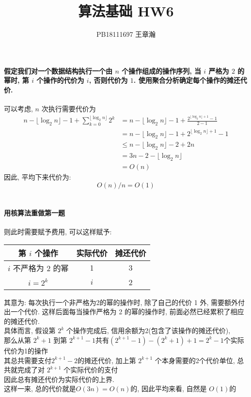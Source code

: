 \documentclass[UTF8]{article}
\title{算法基础 HW6}
\author{PB18111697 王章瀚}
\newcommand{\jumpLine} {\hspace*{\fill} \\}
\newcommand{\floor}[1]{\lfloor#1\rfloor}
\begin{document}
\maketitle
\section{}
\noindent \textbf{假定我们对一个数据结构执行一个由 $n$ 个操作组成的操作序列, 当 $i$ 严格为 $2$ 的幂时, 第 $i$ 个操作的代价为 $i$, 否则代价为 $1$. 使用聚合分析确定每个操作的摊还代价.}\\
\jumpLine
可以考虑, $n$ 次执行需要代价为
\begin{align*}
n - \floor{\log_2 n} - 1 + \sum\limits_{k=0}^{\floor{\log_2 n}}2^k &=n - \floor{\log_2 n} - 1 + \frac{2^{\floor{\log_2 n}+1}-1}{2-1}\\
&=n - \floor{\log_2 n} - 1 + 2^{\floor{\log_2 n}+1}-1\\
&\le n - \floor{\log_2 n} - 2 + 2n\\
&=3n-2-\floor{\log_2 n}\\
&=O(n)
 \end{align*}
因此, 平均下来代价为:
$$O(n)/n=O(1)$$
\section{}
\noindent \textbf{用核算法重做第一题}\\
\jumpLine
则此时需要赋予费用, 可以这样赋予:\\
\begin{center}
\begin{tabular}{|c|c|c|}
\hline
第 $i$ 个操作 & 实际代价 & 摊还代价 \\
\hline
$i$ 不严格为 2 的幂 & 1 & 3 \\
\hline
$i=2^k$ & $i$ & 2\\
\hline
\end{tabular}
\end{center}
其意为: 每次执行一个非严格为2的幂的操作时, 除了自己的代价 1 外, 需要额外付出一个代价. 这样后面每当操作严格为 2 的幂的操作时, 前面必然已经累积了相应的摊还代价.\\
具体而言, 假设第 $2^k$ 个操作完成后, 信用余额为2(包含了该操作的摊还代价), \\
那么从第 $2^k+1$ 到第 $2^{k+1}-1$共有$(2^{k+1}-1) - (2^{k}+1) + 1=2^k-1$个实际代价为1的操作\\
其总共需要支付$2^{k+1}-2$的摊还代价, 加上第 $2^{k+1}$ 个本身需要的2个代价单位, 总共就完成了对 $2^{k+1}$ 个实际代价的支付\\
因此总有摊还代价为实际代价的上界.\\
这样一来, 总的代价就是$O(3n)=O(n)$的, 因此平均来看, 自然是 $O(1)$的
\end{document}
